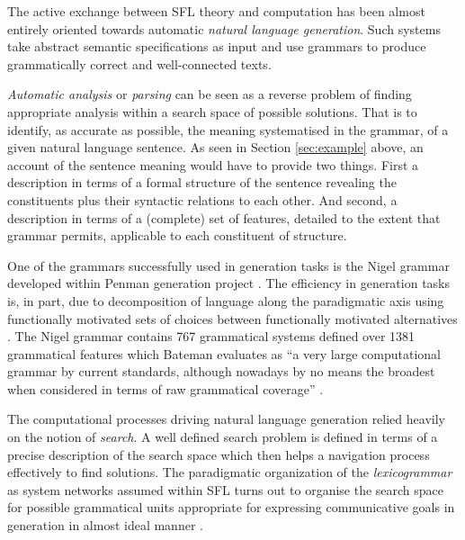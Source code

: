 The active exchange between SFL theory and computation has been almost entirely oriented towards automatic \textit{natural language generation}. Such systems take abstract semantic specifications as input and use grammars to produce grammatically correct and well-connected texts. %

\textit{Automatic analysis} or \textit{parsing} can be seen as a reverse problem of finding appropriate analysis within a search space of possible solutions. That is to identify, as accurate as possible, the meaning systematised in the grammar, of a given natural language sentence. As seen in Section \ref{sec:example} above, an account of the sentence meaning would have to provide two things. First a description in terms of a formal structure of the sentence revealing the constituents plus their syntactic relations to each other. And second, a description in terms of a (complete) set of features, detailed to the extent that grammar permits, applicable to each constituent of structure. %

One of the grammars successfully used in generation tasks is the Nigel grammar developed within Penman generation project \citep{Mann83}. The efficiency in generation tasks is, in part, due to decomposition of language along the paradigmatic axis using functionally motivated sets of choices between functionally motivated alternatives \citep{McDonald80}. The Nigel grammar contains 767 grammatical systems defined over 1381 grammatical features which Bateman evaluates as ``a very large computational grammar by current standards, although nowadays by no means the broadest when considered in terms of raw grammatical coverage'' \citep[29]{Bateman2008}.

The computational processes driving natural language generation relied heavily on the notion of \textit{search}. A well defined search problem is defined in terms of a precise description of the search space which then helps a navigation process effectively to find solutions. The paradigmatic organization of the \textit{lexicogrammar} as system networks assumed within SFL turns out to organise the search space for possible grammatical units appropriate for expressing communicative goals in generation in almost ideal manner \citep[28]{Bateman2008}.

